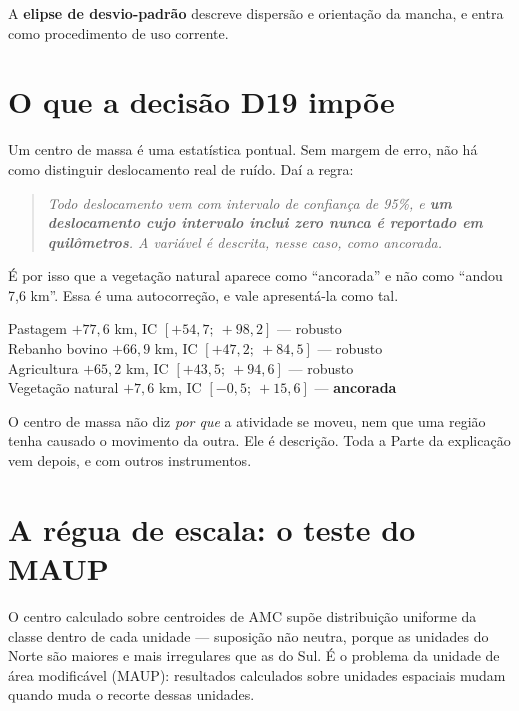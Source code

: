 A \textbf{elipse de desvio-padrão} descreve dispersão e orientação da mancha, e
entra como procedimento de uso corrente.

\section{O que a decisão D19 impõe}

Um centro de massa é uma estatística pontual. Sem margem de erro, não há como
distinguir deslocamento real de ruído. Daí a regra:

\begin{quote}\itshape
Todo deslocamento vem com intervalo de confiança de 95\%, e \textbf{um
deslocamento cujo intervalo inclui zero nunca é reportado em quilômetros}. A
variável é descrita, nesse caso, como \emph{ancorada}.
\end{quote}

É por isso que a vegetação natural aparece como ``ancorada'' e não como ``andou
7,6 km''. Essa é uma autocorreção, e vale apresentá-la como tal.

\begin{ancora}
Pastagem $+77{,}6$ km, IC $[+54{,}7;\ +98{,}2]$ --- robusto \\
Rebanho bovino $+66{,}9$ km, IC $[+47{,}2;\ +84{,}5]$ --- robusto \\
Agricultura $+65{,}2$ km, IC $[+43{,}5;\ +94{,}6]$ --- robusto \\
Vegetação natural $+7{,}6$ km, IC $[-0{,}5;\ +15{,}6]$ --- \textbf{ancorada}
\end{ancora}

\begin{naodiz}
O centro de massa não diz \emph{por que} a atividade se moveu, nem que uma
região tenha causado o movimento da outra. Ele é descrição. Toda a Parte da
explicação vem depois, e com outros instrumentos.
\end{naodiz}

\section{A régua de escala: o teste do MAUP}

O centro calculado sobre centroides de AMC supõe distribuição uniforme da
classe dentro de cada unidade --- suposição não neutra, porque as unidades do
Norte são maiores e mais irregulares que as do Sul. É o problema da unidade de
área modificável (MAUP): resultados calculados sobre unidades espaciais mudam
quando muda o recorte dessas unidades.

